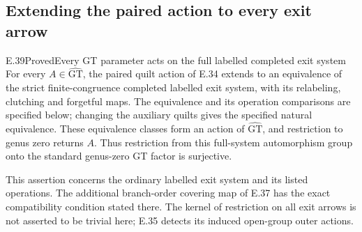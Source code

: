 \subsection{Extending the paired action to every exit arrow}

\begin{result}{E.39}{Proved}{Every GT parameter acts on the full labelled completed exit system}
For every $A\in\widehat{\mathrm{GT}}$, the paired quilt action of
E.34 extends to an equivalence of the strict finite-congruence
completed labelled exit system, with its relabeling, clutching and
forgetful maps.  The equivalence and its operation comparisons
are specified below; changing the auxiliary quilts gives the
specified natural equivalence.  These equivalence classes form an
action of $\widehat{\mathrm{GT}}$, and restriction to genus zero
returns $A$.  Thus restriction from this full-system automorphism
group onto the standard genus-zero GT factor is surjective.

This assertion concerns the ordinary labelled exit system and its
listed operations.  The additional branch-order covering map of
E.37 has the exact compatibility condition stated there.  The
kernel of restriction on all exit arrows is not asserted to be
trivial here; E.35 detects its induced open-group outer actions.
\end{result}
